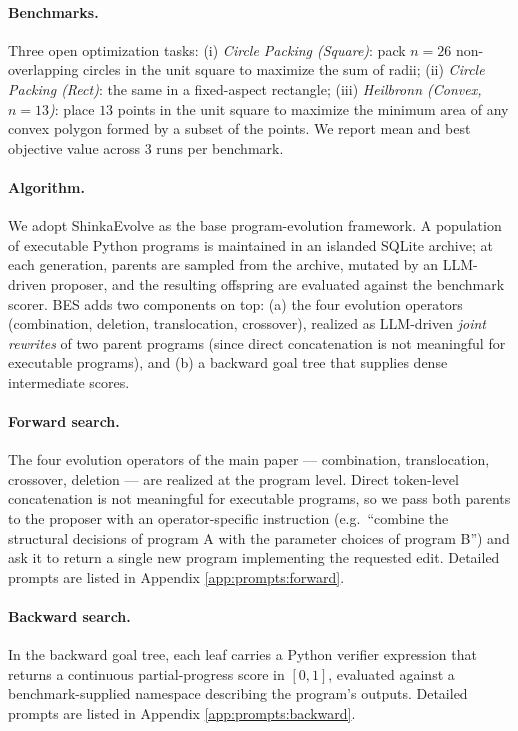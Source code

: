 \paragraph{Benchmarks.}
Three open optimization tasks: (i) \emph{Circle Packing (Square)}:
pack $n=26$ non-overlapping circles in the unit square to maximize the
sum of radii; (ii) \emph{Circle Packing (Rect)}: the same in a
fixed-aspect rectangle; (iii) \emph{Heilbronn (Convex, $n=13$)}: place
$13$ points in the unit square to maximize the minimum area of any
convex polygon formed by a subset of the points. We report mean and
best objective value across $3$ runs per benchmark.

\paragraph{Algorithm.}
We adopt ShinkaEvolve as the base program-evolution framework. A
population of executable Python programs is maintained in an islanded
SQLite archive; at each generation, parents are sampled from the
archive, mutated by an LLM-driven proposer, and the resulting offspring
are evaluated against the benchmark scorer. BES adds two components on
top: (a) the four evolution operators (combination, deletion, translocation,
crossover), realized as LLM-driven \emph{joint rewrites} of two parent
programs (since direct concatenation is not meaningful for executable
programs), and (b) a backward goal tree that supplies dense
intermediate scores.


\paragraph{Forward search.}

The four evolution operators of the main paper --- combination,
translocation, crossover, deletion --- are realized at the
program level. Direct token-level concatenation is not
meaningful for executable programs, so we pass both parents to the proposer with an operator-specific instruction (e.g.\ ``combine the
structural decisions of program A with the parameter choices of
program B'') and ask it to return a single new program implementing the requested edit. Detailed prompts are listed in Appendix \ref{app:prompts:forward}.

\paragraph{Backward search.}
In the backward goal tree, each leaf carries a Python verifier
expression that returns a continuous partial-progress score in
$[0,1]$, evaluated against a benchmark-supplied namespace describing the program's outputs. Detailed prompts are listed in Appendix \ref{app:prompts:backward}.

